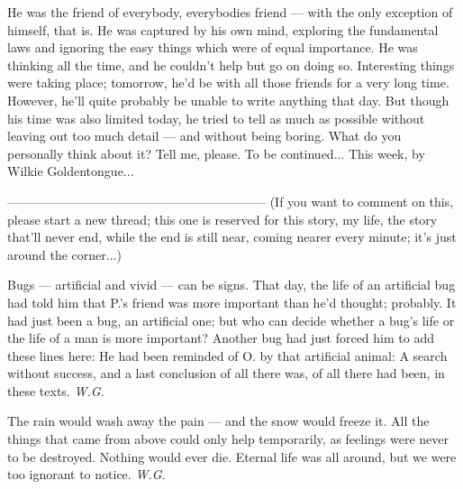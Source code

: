 He was the friend of everybody, everybodies friend --- with the only exception of himself, that is. 
He was captured by his own mind, exploring the fundamental laws and ignoring the easy things which were of equal importance. 
He was thinking all the time, and he couldn't help but go on doing so. 
Interesting things were taking place; tomorrow, he'd be with all those friends for a very long time. However, he'll quite probably be unable to write anything that day. 
But though his time was also limited today, he tried to tell as much as possible without leaving out too much detail --- and without being boring. 
What do you personally think about it? Tell me, please. 
To be continued...
This week, by Wilkie Goldentongue...

--------------------------------------------------------------
(If you want to comment on this, please start a new thread; this one is reserved for this story, my life, the story that'll never end, while the end is still near, coming nearer every minute; it's just around the corner...)

Bugs --- 
artificial and vivid --- 
can be signs. 
That day, 
the life of an artificial bug 
had told him 
that P.'s friend 
was more important 
than he'd thought; 
probably. 
It had just been a bug, 
an artificial one; 
but who can decide 
whether a bug's life 
or the life of a man 
is more important? 
Another bug had just forced him to add these lines here: 
He had been reminded of O. by that artificial animal: 
A search without success, 
and a last conclusion of all there was, 
of all there had been, 
in these texts. 
\emph{W.G.}

The rain 
would wash away the pain --- 
and the snow 
would freeze it. 
All the things that came from above 
could only help 
temporarily, 
as feelings 
were never to be destroyed. 
Nothing would ever die. 
Eternal life was all around, 
but we were too ignorant to notice. 
\emph{W.G.}


